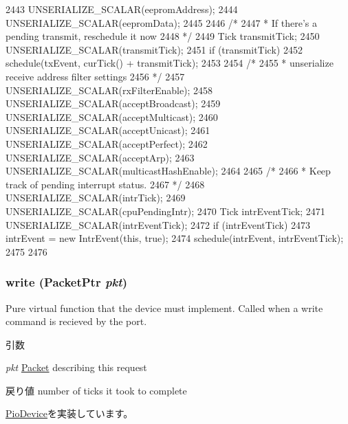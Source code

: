 \begin{DoxyCode}
{2443     UNSERIALIZE_SCALAR(eepromAddress);
2444     UNSERIALIZE_SCALAR(eepromData);
2445 
2446     /*
2447      * If there's a pending transmit, reschedule it now
2448      */
2449     Tick transmitTick;
2450     UNSERIALIZE_SCALAR(transmitTick);
2451     if (transmitTick)
2452         schedule(txEvent, curTick() + transmitTick);
2453 
2454     /*
2455      * unserialize receive address filter settings
2456      */
2457     UNSERIALIZE_SCALAR(rxFilterEnable);
2458     UNSERIALIZE_SCALAR(acceptBroadcast);
2459     UNSERIALIZE_SCALAR(acceptMulticast);
2460     UNSERIALIZE_SCALAR(acceptUnicast);
2461     UNSERIALIZE_SCALAR(acceptPerfect);
2462     UNSERIALIZE_SCALAR(acceptArp);
2463     UNSERIALIZE_SCALAR(multicastHashEnable);
2464 
2465     /*
2466      * Keep track of pending interrupt status.
2467      */
2468     UNSERIALIZE_SCALAR(intrTick);
2469     UNSERIALIZE_SCALAR(cpuPendingIntr);
2470     Tick intrEventTick;
2471     UNSERIALIZE_SCALAR(intrEventTick);
2472     if (intrEventTick) {
2473         intrEvent = new IntrEvent(this, true);
2474         schedule(intrEvent, intrEventTick);
2475     }
2476 }
\end{DoxyCode}
\hypertarget{classNSGigE_a4cefab464e72b5dd42c003a0a4341802}{
\subsubsection[{write}]{ write ({\bf PacketPtr} {\em pkt})}}
\label{classNSGigE_a4cefab464e72b5dd42c003a0a4341802}
Pure virtual function that the device must implement. Called when a write command is recieved by the port. 
\begin{DoxyParams}{引数}
\item[{\em pkt}]\hyperlink{classPacket}{Packet} describing this request \end{DoxyParams}
\begin{DoxyReturn}{戻り値}
number of ticks it took to complete 
\end{DoxyReturn}


\hyperlink{classPioDevice_afe8371668d023bb2516b286e5e399b6f}{PioDevice}を実装しています。


